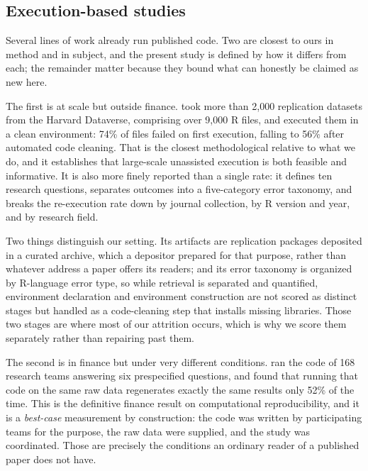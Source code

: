 \subsection{Execution-based studies}\label{sec:exec_studies}

Several lines of work already run published code. Two are closest to ours in
method and in subject, and the present study is defined by how it differs from
each; the remainder matter because they bound what can honestly be claimed as new
here.

The first is at scale but outside finance. \citet{Trisovic2022} took more than
2,000 replication datasets from the Harvard Dataverse, comprising over 9,000 R
files, and executed them in a clean environment: 74\% of files failed on first
execution, falling to 56\% after automated code cleaning. That is the closest
methodological relative to what we do, and it establishes that large-scale
unassisted execution is both feasible and informative. It is also more
finely reported than a single rate: it defines ten research questions, separates
outcomes into a five-category error taxonomy, and breaks the re-execution rate
down by journal collection, by R version and year, and by research field.

Two things distinguish our setting. Its artifacts are replication packages
deposited in a curated archive, which a depositor prepared for that purpose,
rather than whatever address a paper offers its readers; and its error taxonomy
is organized by R-language error type, so while retrieval is separated and
quantified, environment declaration and environment construction are not scored
as distinct stages but handled as a code-cleaning step that installs missing
libraries. Those two stages are where most of our attrition occurs, which is why
we score them separately rather than repairing past them.

The second is in finance but under very different conditions.
\citet{Perignon2024} ran the code of 168 research teams answering six
prespecified questions, and found that running that code on the same raw data
regenerates exactly the same results only 52\% of the time. This is the
definitive finance result on computational reproducibility, and it is a
\emph{best-case} measurement by construction: the code was written by
participating teams for the purpose, the raw data were supplied, and the study
was coordinated. Those are precisely the conditions an ordinary reader of a
published paper does not have.

